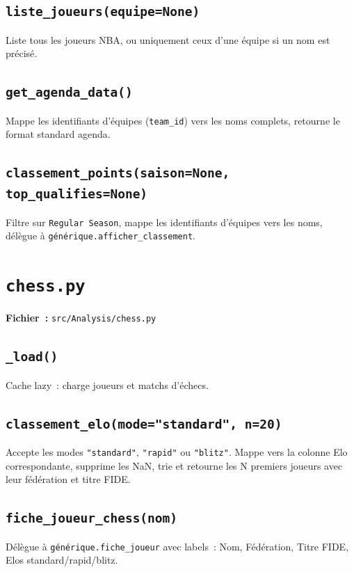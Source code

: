 \documentclass[12pt,a4paper]{article}
\begin{document}
\subsection{\texttt{liste\_joueurs(equipe=None)}}
Liste tous les joueurs NBA, ou uniquement ceux d'une équipe si un nom est
précisé.

\subsection{\texttt{get\_agenda\_data()}}
Mappe les identifiants d'équipes (\texttt{team\_id}) vers les noms complets,
retourne le format standard agenda.

\subsection{\texttt{classement\_points(saison=None, top\_qualifies=None)}}
Filtre sur \texttt{Regular Season}, mappe les identifiants d'équipes vers
les noms, délègue à \texttt{générique.afficher\_classement}.

\section{\texttt{chess.py}}

\textbf{Fichier~:} \texttt{src/Analysis/chess.py}

\subsection{\texttt{\_load()}}
Cache lazy~: charge joueurs et matchs d'échecs.

\subsection{\texttt{classement\_elo(mode="standard", n=20)}}
Accepte les modes \texttt{"standard"}, \texttt{"rapid"} ou \texttt{"blitz"}.
Mappe vers la colonne Elo correspondante, supprime les NaN, trie et retourne
les N premiers joueurs avec leur fédération et titre FIDE.

\subsection{\texttt{fiche\_joueur\_chess(nom)}}
Délègue à \texttt{générique.fiche\_joueur} avec labels~: Nom, Fédération,
Titre FIDE, Elos standard/rapid/blitz.
\end{document}
